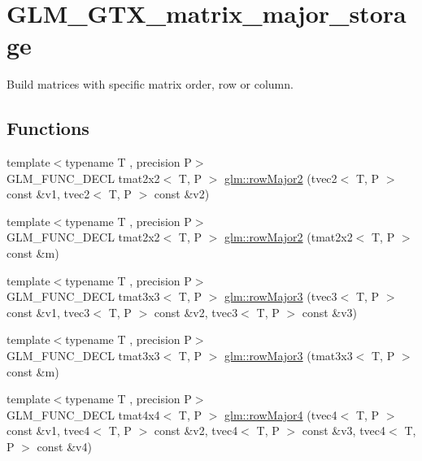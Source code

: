 \hypertarget{group__gtx__matrix__major__storage}{}\section{G\+L\+M\+\_\+\+G\+T\+X\+\_\+matrix\+\_\+major\+\_\+storage}
\label{group__gtx__matrix__major__storage}


Build matrices with specific matrix order, row or column.  


\subsection*{Functions}
\begin{DoxyCompactItemize}
\item 
{\footnotesize template$<$typename T , precision P$>$ }\\G\+L\+M\+\_\+\+F\+U\+N\+C\+\_\+\+D\+E\+C\+L tmat2x2$<$ T, P $>$ \hyperlink{group__gtx__matrix__major__storage_ga0c7f4d56a85865f0002127119ab7d551}{glm\+::row\+Major2} (tvec2$<$ T, P $>$ const \&v1, tvec2$<$ T, P $>$ const \&v2)
\item 
{\footnotesize template$<$typename T , precision P$>$ }\\G\+L\+M\+\_\+\+F\+U\+N\+C\+\_\+\+D\+E\+C\+L tmat2x2$<$ T, P $>$ \hyperlink{group__gtx__matrix__major__storage_ga42a006aa66198452bd3c89415f892196}{glm\+::row\+Major2} (tmat2x2$<$ T, P $>$ const \&m)
\item 
{\footnotesize template$<$typename T , precision P$>$ }\\G\+L\+M\+\_\+\+F\+U\+N\+C\+\_\+\+D\+E\+C\+L tmat3x3$<$ T, P $>$ \hyperlink{group__gtx__matrix__major__storage_gaba4de9afc4e65ec8ea0403e7cba3fb9f}{glm\+::row\+Major3} (tvec3$<$ T, P $>$ const \&v1, tvec3$<$ T, P $>$ const \&v2, tvec3$<$ T, P $>$ const \&v3)
\item 
{\footnotesize template$<$typename T , precision P$>$ }\\G\+L\+M\+\_\+\+F\+U\+N\+C\+\_\+\+D\+E\+C\+L tmat3x3$<$ T, P $>$ \hyperlink{group__gtx__matrix__major__storage_ga38537061135b55e7a053926ca55e6e20}{glm\+::row\+Major3} (tmat3x3$<$ T, P $>$ const \&m)
\item 
{\footnotesize template$<$typename T , precision P$>$ }\\G\+L\+M\+\_\+\+F\+U\+N\+C\+\_\+\+D\+E\+C\+L tmat4x4$<$ T, P $>$ \hyperlink{group__gtx__matrix__major__storage_ga3ce8f2a78fb2f15bf28151ee128b0ae8}{glm\+::row\+Major4} (tvec4$<$ T, P $>$ const \&v1, tvec4$<$ T, P $>$ const \&v2, tvec4$<$ T, P $>$ const \&v3, tvec4$<$ T, P $>$ const \&v4)

\end{DoxyCompactItemize}
